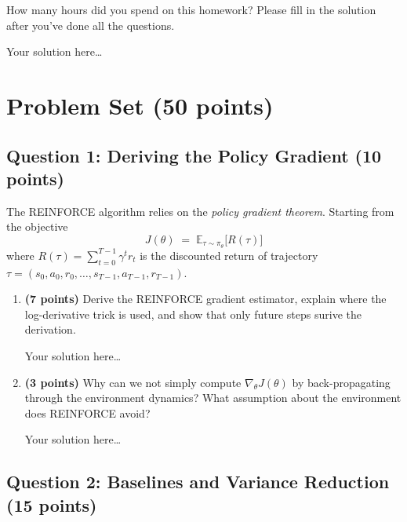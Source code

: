 \documentclass[11pt]{article}
\begin{document}
How many hours did you spend on this homework?  Please fill in the
solution after you've done all the questions.

\begin{solution}
Your solution here\ldots
\end{solution}

\section*{Problem Set (50 points)}

\subsection*{Question 1: Deriving the Policy Gradient (10 points)}

The REINFORCE algorithm relies on the \emph{policy gradient theorem}.
Starting from the objective
\[
  J(\theta) \;=\; \mathbb{E}_{\tau \sim \pi_\theta}\!\bigl[R(\tau)\bigr]
\]
where $R(\tau) = \sum_{t=0}^{T-1} \gamma^t r_t$ is the discounted return
of trajectory $\tau = (s_0,a_0,r_0,\dots,s_{T-1},a_{T-1},r_{T-1})$.

\begin{enumerate}[label=(\alph*)]
\item \textbf{(7 points)} Derive the REINFORCE gradient estimator, explain where the log-derivative trick is used, and show that only future steps surive the derivation.

\begin{solution}
Your solution here\ldots
\end{solution}

\item \textbf{(3 points)} Why can we not simply compute
$\nabla_\theta J(\theta)$ by back-propagating through the environment
dynamics?  What assumption about the environment does REINFORCE avoid?

\begin{solution}
Your solution here\ldots
\end{solution}
\end{enumerate}


\subsection*{Question 2: Baselines and Variance Reduction (15 points)}
\end{document}

